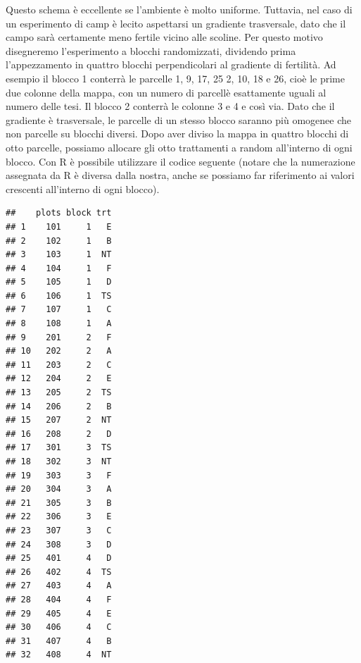 \documentclass[a4paper,12pt,oneside]{book}
\newenvironment{Shaded}{\begin{snugshade}}{\end{snugshade}}
\newcommand{\KeywordTok}[1]{\textcolor[rgb]{0.13,0.29,0.53}{\textbf{#1}}}
\newcommand{\DataTypeTok}[1]{\textcolor[rgb]{0.13,0.29,0.53}{#1}}
\newcommand{\DecValTok}[1]{\textcolor[rgb]{0.00,0.00,0.81}{#1}}
\newcommand{\StringTok}[1]{\textcolor[rgb]{0.31,0.60,0.02}{#1}}
\newcommand{\OperatorTok}[1]{\textcolor[rgb]{0.81,0.36,0.00}{\textbf{#1}}}
\newcommand{\NormalTok}[1]{#1}
\begin{document}
Questo schema è eccellente se l'ambiente è molto uniforme. Tuttavia, nel
caso di un esperimento di camp è lecito aspettarsi un gradiente
trasversale, dato che il campo sarà certamente meno fertile vicino alle
scoline. Per questo motivo disegneremo l'esperimento a blocchi
randomizzati, dividendo prima l'appezzamento in quattro blocchi
perpendicolari al gradiente di fertilità. Ad esempio il blocco 1
conterrà le parcelle 1, 9, 17, 25 2, 10, 18 e 26, cioè le prime due
colonne della mappa, con un numero di parcellè esattamente uguali al
numero delle tesi. Il blocco 2 conterrà le colonne 3 e 4 e così via.
Dato che il gradiente è trasversale, le parcelle di un stesso blocco
saranno più omogenee che non parcelle su blocchi diversi. Dopo aver
diviso la mappa in quattro blocchi di otto parcelle, possiamo allocare
gli otto trattamenti a random all'interno di ogni blocco. Con R è
possibile utilizzare il codice seguente (notare che la numerazione
assegnata da R è diversa dalla nostra, anche se possiamo far riferimento
ai valori crescenti all'interno di ogni blocco).

\begin{Shaded}
\end{Shaded}

\begin{verbatim}
##    plots block trt
## 1    101     1   E
## 2    102     1   B
## 3    103     1  NT
## 4    104     1   F
## 5    105     1   D
## 6    106     1  TS
## 7    107     1   C
## 8    108     1   A
## 9    201     2   F
## 10   202     2   A
## 11   203     2   C
## 12   204     2   E
## 13   205     2  TS
## 14   206     2   B
## 15   207     2  NT
## 16   208     2   D
## 17   301     3  TS
## 18   302     3  NT
## 19   303     3   F
## 20   304     3   A
## 21   305     3   B
## 22   306     3   E
## 23   307     3   C
## 24   308     3   D
## 25   401     4   D
## 26   402     4  TS
## 27   403     4   A
## 28   404     4   F
## 29   405     4   E
## 30   406     4   C
## 31   407     4   B
## 32   408     4  NT
\end{verbatim}
\end{document}
